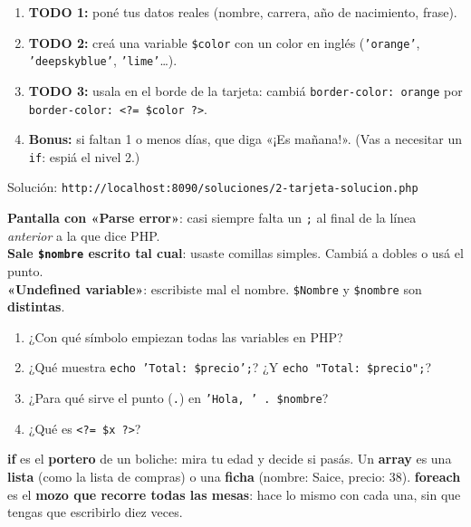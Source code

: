 \begin{reto}
\begin{enumerate}
  \item \textbf{TODO 1:} poné tus datos reales (nombre, carrera, año de nacimiento, frase).
  \item \textbf{TODO 2:} creá una variable \texttt{\$color} con un color en inglés (\texttt{'orange'}, \texttt{'deepskyblue'}, \texttt{'lime'}\ldots).
  \item \textbf{TODO 3:} usala en el borde de la tarjeta: cambiá \texttt{border-color: orange} por \texttt{border-color: <?= \$color ?>}.
  \item \textbf{Bonus:} si faltan 1 o menos días, que diga «¡Es mañana!». (Vas a necesitar un \texttt{if}: espiá el nivel 2.)
\end{enumerate}
Solución: \texttt{http://localhost:8090/soluciones/2-tarjeta-solucion.php}
\end{reto}

\begin{errores}
\textbf{Pantalla con «Parse error»}: casi siempre falta un \texttt{;} al final de la línea \emph{anterior} a la que dice PHP.\\[1mm]
\textbf{Sale \texttt{\$nombre} escrito tal cual}: usaste comillas simples. Cambiá a dobles o usá el punto.\\[1mm]
\textbf{«Undefined variable»}: escribiste mal el nombre. \texttt{\$Nombre} y \texttt{\$nombre} son \textbf{distintas}.
\end{errores}

\begin{comprueba}
\begin{enumerate}
  \item ¿Con qué símbolo empiezan todas las variables en PHP?
  \item ¿Qué muestra \texttt{echo 'Total: \$precio';}? ¿Y \texttt{echo "Total: \$precio";}?
  \item ¿Para qué sirve el punto (\texttt{.}) en \texttt{'Hola, ' . \$nombre}?
  \item ¿Qué es \texttt{<?= \$x ?>}?
\end{enumerate}
\end{comprueba}


\begin{analogia}
\textbf{if} es el \textbf{portero} de un boliche: mira tu edad y decide si pasás. Un \textbf{array} es una \textbf{lista}
(como la lista de compras) o una \textbf{ficha} (nombre: Saice, precio: 38). \textbf{foreach} es el \textbf{mozo que recorre todas las
mesas}: hace lo mismo con cada una, sin que tengas que escribirlo diez veces.
\end{analogia}

